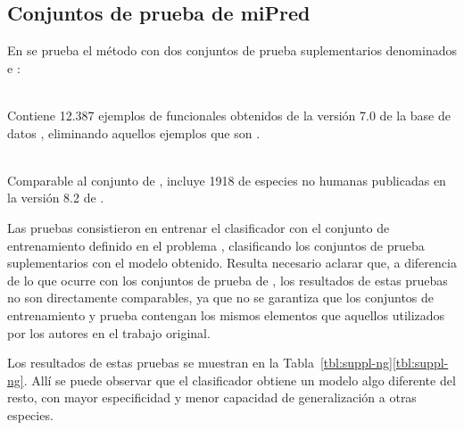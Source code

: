 %
%
\subsection{Conjuntos de prueba de miPred}
%
En \cite{ng} se prueba el método \work\mipred{} con dos conjuntos de
prueba suplementarios denominados  e :
%
\begin{description}
\item{}\\
  Contiene 12.387 ejemplos de  funcionales obtenidos de la
  versión 7.0 de la base de datos  \cite{rfam}, eliminando
  aquellos ejemplos que son .
\item{}\\
  Comparable al conjunto  de \cite{xue}, incluye
  1918  de especies no humanas publicadas en la versión 8.2
  de \work{\mirbase}.
\end{description}
%
Las pruebas consistieron en entrenar el clasificador con el conjunto
de entrenamiento definido en el problema \prob\mipred{}, clasificando
los conjuntos de prueba suplementarios con el modelo obtenido.
Resulta necesario aclarar que, a diferencia de lo que ocurre con los
conjuntos de prueba de \work\tripletsvm{}, los resultados de estas
pruebas no son directamente comparables, ya que no se garantiza que
los conjuntos de entrenamiento y prueba contengan los mismos elementos
que aquellos utilizados por los autores en el trabajo original.

Los resultados de estas pruebas se muestran en la
\iflatexml{}Tabla~\ref{tbl:suppl-ng}\else\autoref{tbl:suppl-ng}\fi.
Allí se puede observar que el clasificador  obtiene un
modelo algo diferente del resto, con mayor especificidad y menor
capacidad de generalización a otras especies.

